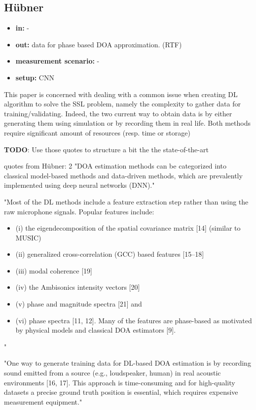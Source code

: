 \documentclass{article}
\begin{document}
\subsection{Hübner}

\begin{itemize}
    \item \textbf{in:} -
    \item \textbf{out:} data for phase based DOA approximation. (RTF)
    \item \textbf{measurement scenario:} -
    \item \textbf{setup:} CNN
\end{itemize}

This paper is concerned with dealing with a common issue when creating DL algorithm to solve the SSL problem, namely the complexity to gather data for training/validating. Indeed, the two current way to obtain data is by either generating them using simulation or by recording them in real life. Both methods require significant amount of resources (resp. time or storage)

\textbf{TODO}: Use those quotes to structure a bit the the state-of-the-art

quotes from Hübner:
2
"DOA estimation methods can be categorized into classical model-based methods and data-driven methods, which are prevalently implemented using deep neural networks (DNN)."

"Most of the DL methods include a feature extraction step rather than using the raw microphone signals. Popular features include:

\begin{itemize}
    \item (i) the eigendecomposition of the spatial covariance matrix [14] (similar to MUSIC)
    \item (ii) generalized cross-correlation (GCC) based features [15–18]
    \item (iii) modal coherence [19]
    \item (iv) the Ambisonics intensity vectors [20]
    \item (v) phase and magnitude spectra [21] and
    \item (vi) phase spectra [11, 12]. Many of the features are phase-based as motivated by physical models and classical DOA estimators [9].
\end{itemize}
"

"One way to generate training data for DL-based DOA estimation is by recording sound emitted from a source (e.g., loudspeaker, human) in real acoustic environments [16, 17]. This approach is time-consuming and for high-quality datasets a precise ground truth position is essential, which requires expensive measurement equipment."
\end{document}
